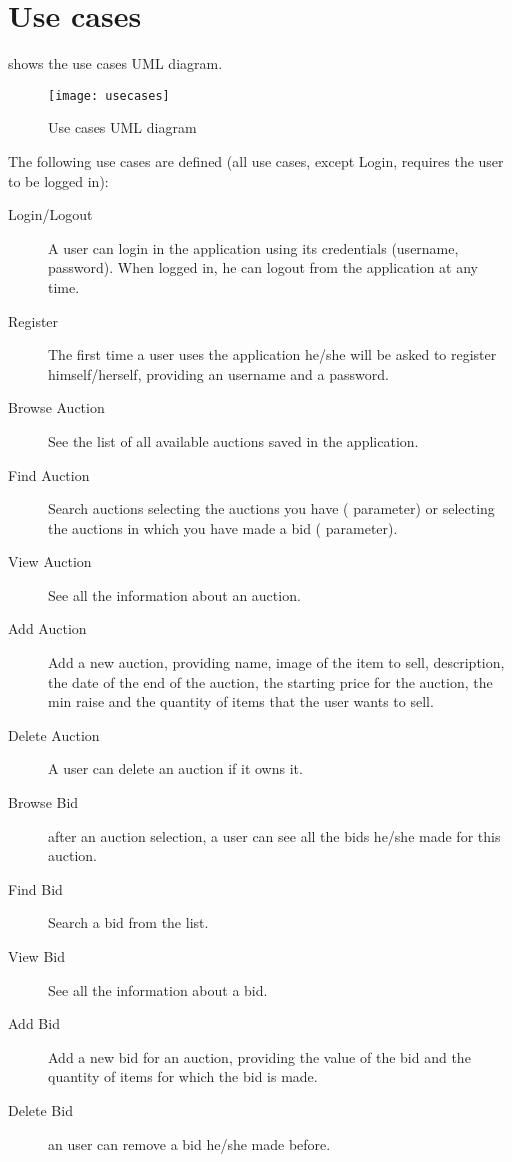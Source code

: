 \chapter{Use cases}\label{ch:usecases}

 shows the use cases UML diagram.

\begin{figure}[htb]
	\centering
	\texttt{[image: usecases]}
	\caption{Use cases UML diagram}\label{fig:usecases}
\end{figure}

The following use cases are defined (all use cases, except Login, requires the
user to be logged in):
\begin{description}
	\item[Login/Logout] A user can login in the application using its
		credentials (username, password). When logged in, he can logout
		from the application at any time.
	\item[Register] The first time a user uses the application he/she will
		be asked to register himself/herself, providing an username and
		a password.
	\item[Browse Auction] See the list of all available auctions saved in
		the application.
	\item[Find Auction] Search auctions selecting the auctions you have
		( parameter) or selecting the auctions in which
		you have made a bid ( parameter).
	\item[View Auction] See all the information about an auction.
	\item[Add Auction] Add a new auction, providing name, image of the item
		to sell, description, the date of the end of the auction, the
		starting price for the auction, the min raise and the quantity
		of items that the user wants to sell.
	\item[Delete Auction] A user can delete an auction if it owns it.
	\item[Browse Bid] after an auction selection, a user can see all the
		bids he/she made for this auction.
	\item[Find Bid] Search a bid from the list.
	\item[View Bid] See all the information about a bid.
	\item[Add Bid] Add a new bid for an auction, providing the value of the
		bid and the quantity of items for which the bid is made.
	\item[Delete Bid] an user can remove a bid he/she made before.
\end{description}
